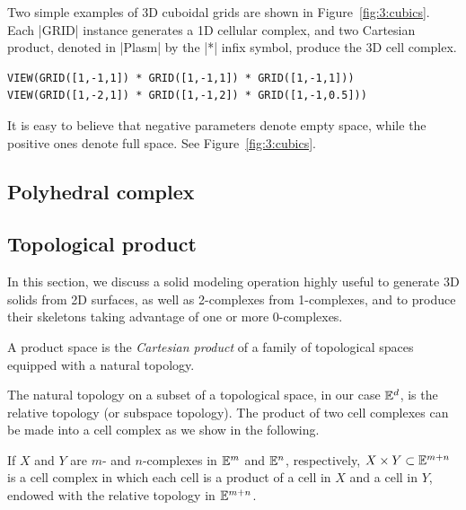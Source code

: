 \begin{coding}\label{script-3.2.12}
Two simple examples  of 3D  cuboidal grids are shown in Figure~\ref{fig:3:cubics}. Each |GRID| instance generates a 1D cellular complex, and two Cartesian product, denoted in |Plasm| by the |*| infix symbol, produce the 3D cell complex.
\begin{lstlisting}[language=JuliaLocal, style=julia, mathescape=false]
VIEW(GRID([1,-1,1]) * GRID([1,-1,1]) * GRID([1,-1,1]))
VIEW(GRID([1,-2,1]) * GRID([1,-1,2]) * GRID([1,-1,0.5]))
\end{lstlisting}
It is easy to believe that negative parameters denote empty space, while the positive ones denote full space. See Figure~\ref{fig:3:cubics}.
\end{coding}







\subsection{Polyhedral complex}\label{sect:3-2-3}


\subsection*{Topological product}
\label{subsec:2:style}

In this section, we discuss a solid modeling operation highly useful to generate 3D solids from 2D surfaces, as well as 2-complexes from 1-complexes, and to produce their skeletons taking advantage of one or more 0-complexes.

\begin{definition}
A product space is the \emph{Cartesian product} of a family of topological spaces equipped with a natural topology.
\end{definition}

The natural topology on a subset of a topological space, in our case $\mathbb{E}^d$, is the relative topology (or subspace topology).
The product of two cell complexes can be made into a cell complex as we show in the following. 

\begin{definition}
If $X$ and $Y$ are  $m$- and $n$-complexes in $\mathbb{E}^m$ and $\mathbb{E}^n$, respectively,  $X \times Y \subset \mathbb{E}^{m+n}$ is a cell complex in which each cell is a product of a cell in $X$ and a cell in $Y$, endowed with the relative topology in $\mathbb{E}^{m+n}$.
\end{definition}

